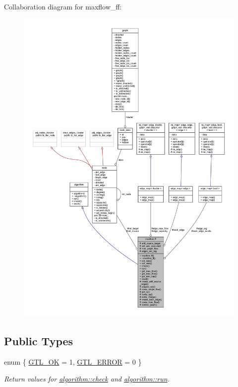 Collaboration diagram for maxflow\+\_\+ff\+:\nopagebreak
\begin{figure}[H]
\begin{center}
\leavevmode
\includegraphics[width=350pt]{classmaxflow__ff__coll__graph}
\end{center}
\end{figure}
\subsection*{Public Types}
\begin{DoxyCompactItemize}
\item 
enum \{ \mbox{\hyperlink{classalgorithm_af1a0078e153aa99c24f9bdf0d97f6710a5114c20e4a96a76b5de9f28bf15e282b}{G\+T\+L\+\_\+\+OK}} = 1, 
\mbox{\hyperlink{classalgorithm_af1a0078e153aa99c24f9bdf0d97f6710a6fcf574690bbd6cf710837a169510dd7}{G\+T\+L\+\_\+\+E\+R\+R\+OR}} = 0
 \}
\begin{DoxyCompactList}\small\item\em Return values for \mbox{\hyperlink{classalgorithm_a76361fb03ad1cf643affc51821e43bed}{algorithm\+::check}} and \mbox{\hyperlink{classalgorithm_a734b189509a8d6b56b65f8ff772d43ca}{algorithm\+::run}}. \end{DoxyCompactList}\end{DoxyCompactItemize}
